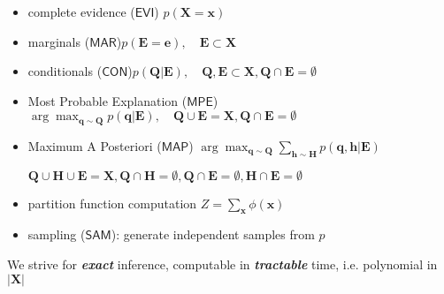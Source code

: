 \documentclass[xcolor={usenames,dvipsnames,svgnames}, compress, aspectratio=169, 11pt]{beamer}
\begin{document}
\begin{frame}[t]
  \frametitle{}


  \begin{minipage}[t]{0.9\linewidth}
    \begin{itemize}
      \setlength{\itemsep}{7pt}
    \item complete evidence ({\footnotesize$\mathsf{EVI}$})\hfill
      {\scriptsize$p(\mathbf{X} = \mathbf{x})$}
    \item 
      marginals ({\footnotesize$\mathsf{MAR}$})\hfill {\scriptsize$p(\mathbf{E=\mathbf{e}}),\quad \mathbf{E}\subset\mathbf{X}$}
    \item
       conditionals ({\footnotesize$\mathsf{CON}$})\hfill {\scriptsize$p(\mathbf{Q}|\mathbf{E}),\quad \mathbf{Q},
      \mathbf{E}\subset\mathbf{X}, \mathbf{Q}\cap
      \mathbf{E}=\emptyset$}
      
    \item
       Most Probable Explanation ({\footnotesize$\mathsf{MPE}$})\hfill {\scriptsize$\arg\max_{\mathbf{q}\sim\mathbf{Q}}p(\mathbf{q}|\mathbf{E}),\quad
      \mathbf{Q}\cup \mathbf{E}=\mathbf{X}, \mathbf{Q}\cap
      \mathbf{E}=\emptyset$}
    \item  Maximum A
      Posteriori ({\footnotesize$\mathsf{MAP}$}) \hfill
      {\scriptsize$\arg\max_{\mathbf{q}\sim\mathbf{Q}}\sum_{\mathbf{h}\sim\mathbf{H}}p(\mathbf{q},\mathbf{h}|\mathbf{E})$}\par
      \hfill{\scriptsize$\mathbf{Q}\cup\mathbf{H}\cup \mathbf{E}=\mathbf{X},
      \mathbf{Q}\cap\mathbf{H}=\emptyset,\mathbf{Q}\cap
      \mathbf{E}=\emptyset, \mathbf{H}\cap \mathbf{E}=\emptyset$}
    \item 
      partition function computation \hfill {\scriptsize$Z = \sum_{\mathbf{x}}\phi(\mathbf{x})$}
    \item sampling ({\footnotesize$\mathsf{SAM}$}): generate independent samples from $p$
    \end{itemize}
  \end{minipage}\par\bigskip
    We strive for \textbf{\emph{exact}} inference, computable in \emph{\textbf{tractable}} time,
    i.e. polynomial in $|\mathbf{X}|$
\end{frame}
\end{document}
